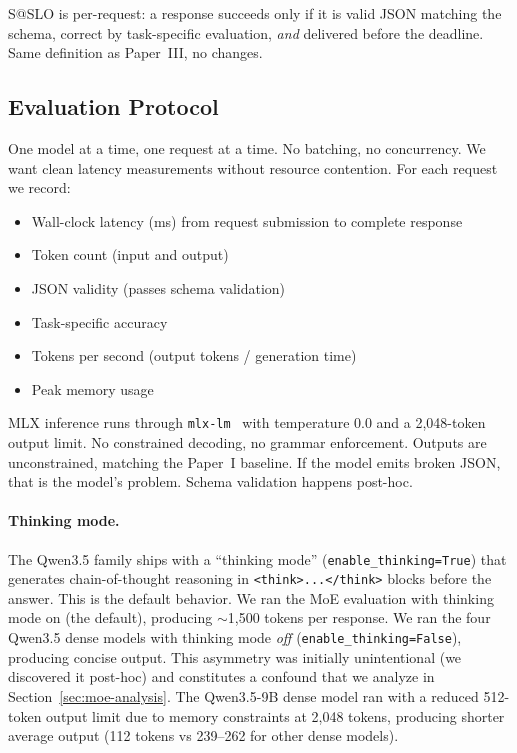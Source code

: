 \documentclass[11pt]{article}
\begin{document}
S@SLO is per-request: a response succeeds only if it is valid JSON matching the schema, correct by task-specific evaluation, \emph{and} delivered before the deadline.  Same definition as Paper~III, no changes.

\subsection{Evaluation Protocol}
\label{sec:eval-protocol}

One model at a time, one request at a time.  No batching, no concurrency.  We want clean latency measurements without resource contention.  For each request we record:

\begin{itemize}[leftmargin=12pt]
    \item Wall-clock latency (ms) from request submission to complete response
    \item Token count (input and output)
    \item JSON validity (passes schema validation)
    \item Task-specific accuracy
    \item Tokens per second (output tokens / generation time)
    \item Peak memory usage
\end{itemize}

MLX inference runs through \texttt{mlx-lm}~\citep{hannun2023mlx} with temperature 0.0 and a 2,048-token output limit.  No constrained decoding, no grammar enforcement.  Outputs are unconstrained, matching the Paper~I baseline.  If the model emits broken JSON, that is the model's problem.  Schema validation happens post-hoc.

\paragraph{Thinking mode.}
The Qwen3.5 family ships with a ``thinking mode'' (\texttt{enable\_thinking=True}) that generates chain-of-thought reasoning in \texttt{<think>...</think>} blocks before the answer.  This is the default behavior.  We ran the MoE evaluation with thinking mode on (the default), producing ${\sim}$1,500 tokens per response.  We ran the four Qwen3.5 dense models with thinking mode \emph{off} (\texttt{enable\_thinking=False}), producing concise output.  This asymmetry was initially unintentional (we discovered it post-hoc) and constitutes a confound that we analyze in Section~\ref{sec:moe-analysis}.  The Qwen3.5-9B dense model ran with a reduced 512-token output limit due to memory constraints at 2,048 tokens, producing shorter average output (112 tokens vs 239--262 for other dense models).
\end{document}
